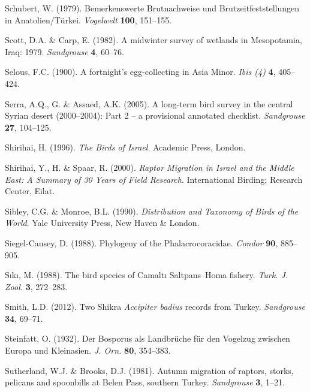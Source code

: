 \documentclass[
  a4paper,
  DIV=11,
  numbers=noendperiod]{scrreprt}
\newlength{\cslhangindent}
\newenvironment{CSLReferences}[2] %
 {\begin{list}{}{%
  \setlength{\itemindent}{0pt}
  \setlength{\leftmargin}{0pt}
  \setlength{\parsep}{0pt}
  \ifodd #1
   \setlength{\leftmargin}{\cslhangindent}
   \setlength{\itemindent}{-1\cslhangindent}
  \fi
  \setlength{\itemsep}{#2\baselineskip}}}
 {\end{list}}
\begin{document}
\begin{CSLReferences}{1}{1}
Schubert, W. (1979). {Bemerkenswerte Brutnachweise und
Brutzeitfeststellungen in Anatolien/Türkei}. \emph{Vogelwelt}
\textbf{100}, 151--155.

Scott, D.A. \& Carp, E. (1982). {A midwinter survey of wetlands in
Mesopotamia, Iraq: 1979}. \emph{Sandgrouse} \textbf{4}, 60--76.

Selous, F.C. (1900). {A fortnight's egg-collecting in Asia Minor}.
\emph{Ibis (4)} \textbf{4}, 405--424.

Serra, A.Q., G. \& Assaed, A.K. (2005). {A long-term bird survey in the
central Syrian desert (2000--2004): Part 2 -- a provisional annotated
checklist}. \emph{Sandgrouse} \textbf{27}, 104--125.

Shirihai, H. (1996). \emph{{The Birds of Israel}}. Academic Press,
London.

Shirihai, Y., H. \& Spaar, R. (2000). \emph{{Raptor Migration in Israel
and the Middle East: A Summary of 30 Years of Field Research}}.
International Birding; Research Center, Eilat.

Sibley, C.G. \& Monroe, B.L. (1990). \emph{{Distribution and Taxonomy of
Birds of the World}}. Yale University Press, New Haven \& London.

Siegel-Causey, D. (1988). {Phylogeny of the Phalacrocoracidae}.
\emph{Condor} \textbf{90}, 885--905.

Sıkı, M. (1988). {The bird species of Camaltı Saltpans--Homa fishery}.
\emph{Turk. J. Zool.} \textbf{3}, 272--283.

Smith, L.D. (2012). {Two Shikra \emph{Accipiter badius} records from
Turkey}. \emph{Sandgrouse} \textbf{34}, 69--71.

Steinfatt, O. (1932). {Der Bosporus als Landbrüche für den Vogelzug
zwischen Europa und Kleinasien}. \emph{J. Orn.} \textbf{80}, 354--383.

Sutherland, W.J. \& Brooks, D.J. (1981). {Autumn migration of raptors,
storks, pelicans and spoonbills at Belen Pass, southern Turkey}.
\emph{Sandgrouse} \textbf{3}, 1--21.


\end{CSLReferences}
\end{document}
